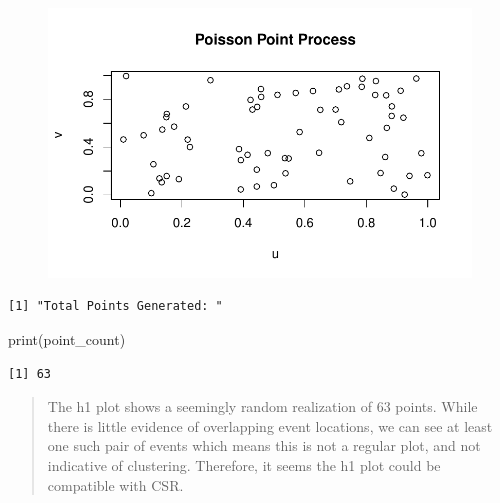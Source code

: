 \documentclass[
  letterpaper,
  DIV=11,
  numbers=noendperiod]{scrartcl}
\newenvironment{Shaded}{\begin{snugshade}}{\end{snugshade}}
\newcommand{\FunctionTok}[1]{\textcolor[rgb]{0.28,0.35,0.67}{#1}}
\newcommand{\NormalTok}[1]{\textcolor[rgb]{0.00,0.23,0.31}{#1}}
\newcommand{\OtherTok}[1]{\textcolor[rgb]{0.00,0.23,0.31}{#1}}
\newcommand{\SpecialCharTok}[1]{\textcolor[rgb]{0.37,0.37,0.37}{#1}}
\newcommand{\StringTok}[1]{\textcolor[rgb]{0.13,0.47,0.30}{#1}}
\begin{document}
\begin{figure}[H]

{\centering \includegraphics{robby_homework1_files/figure-pdf/unnamed-chunk-5-1.pdf}

}

\end{figure}

\begin{Shaded}
\end{Shaded}

\begin{verbatim}
[1] "Total Points Generated: "
\end{verbatim}

\begin{Shaded}
\begin{Highlighting}[]
\FunctionTok{print}\NormalTok{(point\_count)}
\end{Highlighting}
\end{Shaded}

\begin{verbatim}
[1] 63
\end{verbatim}

\begin{quote}
The h1 plot shows a seemingly random realization of 63 points. While
there is little evidence of overlapping event locations, we can see at
least one such pair of events which means this is not a regular plot,
and not indicative of clustering. Therefore, it seems the h1 plot could
be compatible with CSR.
\end{quote}
\end{document}

